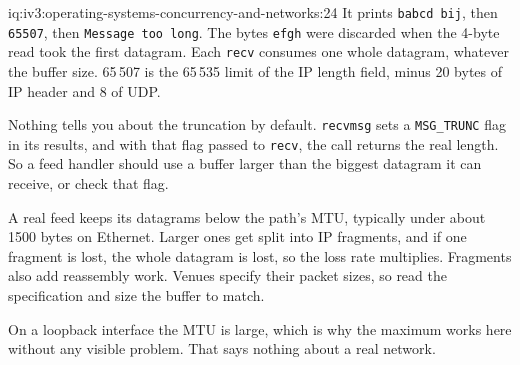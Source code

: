 \begin{solution}{iq:iv3:operating-systems-concurrency-and-networks:24}
It prints \texttt{b\textquotesingle{}abcd\textquotesingle{} b\textquotesingle{}ij\textquotesingle{}}, then \texttt{65507}, then \texttt{Message too long}. The bytes \texttt{efgh} were discarded when the 4-byte read took the first datagram. Each \texttt{recv} consumes one whole datagram, whatever the buffer size. 65\,507 is the 65\,535 limit of the IP length field, minus 20 bytes of IP header and 8 of UDP.

Nothing tells you about the truncation by default. \texttt{recvmsg} sets a \texttt{MSG\_TRUNC} flag in its results, and with that flag passed to \texttt{recv}, the call returns the real length. So a feed handler should use a buffer larger than the biggest datagram it can receive, or check that flag.

A real feed keeps its datagrams below the path's MTU, typically under about 1500 bytes on Ethernet. Larger ones get split into IP fragments, and if one fragment is lost, the whole datagram is lost, so the loss rate multiplies. Fragments also add reassembly work. Venues specify their packet sizes, so read the specification and size the buffer to match.

On a loopback interface the MTU is large, which is why the maximum works here without any visible problem. That says nothing about a real network.

\end{solution}

